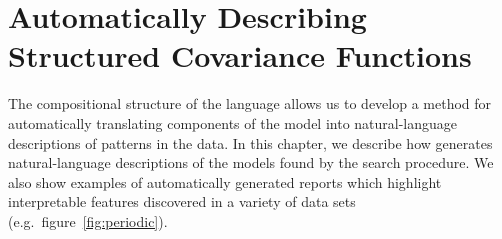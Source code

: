 
\inbpdocument


\chapter{Automatically Describing Structured Covariance Functions}
\label{ch:description}


















The compositional structure of the language allows us to develop a method for automatically translating components of the model into natural-language descriptions of patterns in the data.
In this chapter, we describe how \procedurename{} generates natural-language descriptions of the models found by the search procedure.
We also show examples of automatically generated reports which highlight interpretable features discovered in a variety of data sets (e.g.\ figure~\ref{fig:periodic}).

